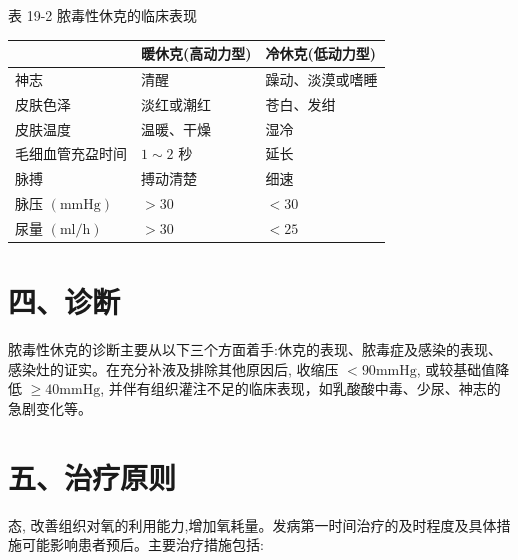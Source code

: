 \documentclass[10pt]{article}
\begin{document}
表 19-2 脓毒性休克的临床表现

\begin{center}
\begin{tabular}{lll}
\hline
 & 暖休克(高动力型) & 冷休克(低动力型) \\
\hline
神志 & 清醒 & 躁动、淡漠或嗜睡 \\
皮肤色泽 & 淡红或潮红 & 苍白、发绀 \\
皮肤温度 & 温暖、干燥 & 湿冷 \\
毛细血管充盁时间 & $1 \sim 2$ 秒 & 延长 \\
脉搏 & 搏动清楚 & 细速 \\
脉压 $(\mathrm{mmHg})$ & $>30$ & $<30$ \\
尿量 $(\mathrm{ml} / \mathrm{h})$ & $>30$ & $<25$ \\
\hline
\end{tabular}
\end{center}

\section*{四、诊断}
脓毒性休克的诊断主要从以下三个方面着手:休克的表现、脓毒症及感染的表现、感染灶的证实。在充分补液及排除其他原因后, 收缩压 $<90 \mathrm{mmHg}$, 或较基础值降低 $\geqslant 40 \mathrm{mmHg}$, 并伴有组织灌注不足的临床表现，如乳酸酸中毒、少尿、神志的急剧变化等。

\section*{五、治疗原则}
态, 改善组织对氧的利用能力,增加氧耗量。发病第一时间治疗的及时程度及具体措施可能影响患者预后。主要治疗措施包括:
\end{document}
